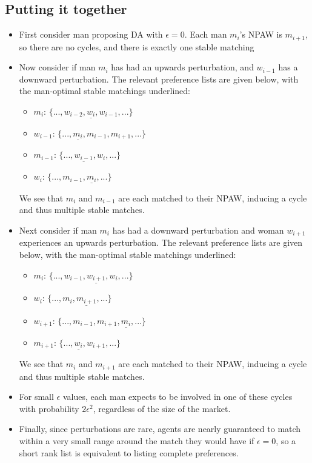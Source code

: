 \documentclass[WP]{AEA}
\begin{document}
\subsection{Putting it together}
\begin{itemize}

	\item First consider man proposing DA with $\epsilon = 0$. Each man $m_i$'s NPAW is $m_{i+1}$, so there are no cycles, and there is exactly one stable matching

	\item Now consider if man $m_i$ has had an upwards perturbation, and $w_{i-1}$ has a downward perturbation. The relevant preference lists are given below, with the man-optimal stable matchings underlined:
	\begin{itemize}
		\item $m_i$: $\{...,w_{i-2}, \underline{w_i}, w_{i-1},...\}$
		\item $w_{i-1}$: $\{...,\underline{m_i}, m_{i-1}, m_{i+1}, ...\}$
		\item $m_{i-1}$: $\{...,\underline{w_{i-1}}, w_i, ...\}$
		\item $w_i$: $\{...,m_{i-1}, \underline{m_i},...\}$
	\end{itemize} 
	We see that $m_i$ and $m_{i-1}$ are each matched to their NPAW, inducing a cycle and thus multiple stable matches.
	\item Next consider if man $m_i$ has had a downward perturbation and woman $w_{i+1}$  experiences an upwards perturbation. The relevant   preference lists are given below, with the man-optimal stable matchings underlined:
	\begin{itemize}
		\item $m_i$: $\{...,w_{i-1}, \underline{w_{i+1}}, w_{i},...\}$
		\item $w_{i}$: $\{...,m_i,\underline{m_{i+1}}, ...\}$
		\item $w_{i+1}$: $\{...,m_{i-1}, m_{i+1}, \underline{m_i},...\}$
		\item $m_{i+1}$: $\{...,\underline{w_{i}}, w_{i+1}, ...\}$

	\end{itemize} 
		We see that $m_i$ and $m_{i+1}$ are each matched to their NPAW, inducing a cycle and thus multiple stable matches.
	
	\item  For small $\epsilon$ values,  each man expects to be involved in one of these cycles with probability $2 \epsilon^2$, regardless of the size of the market.
	
	\item Finally, since perturbations are rare, agents are nearly guaranteed to match within a very small range around the match they would have if $\epsilon = 0$, so  a short rank list is equivalent to listing complete preferences. 
\end{itemize}
\end{document}
